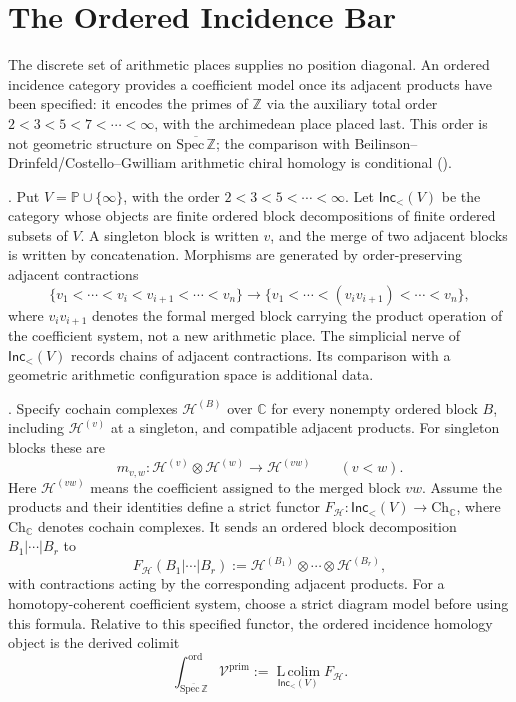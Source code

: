 \section{The Ordered Incidence Bar}
\label{v4-arith:3d-acs:E1-bar}

The discrete set of arithmetic places supplies no position diagonal.
An ordered incidence category provides a coefficient model once its
adjacent products have been specified: it encodes
the primes of \(\mathbb Z\) via the auxiliary total order
\(2<3<5<7<\cdots<\infty\), with the archimedean place placed last.
This order is not geometric structure on
\(\overline{\mathrm{Spec}\,\mathbb Z}\); the comparison with
Beilinson--Drinfeld/Costello--Gwilliam arithmetic chiral homology is
conditional ().

\begin{definition}
\label{v4-arith:3d-acs:def:ordered-incidence-category}
\ClaimStatusDefinitional. Put \(V=\mathbb P\cup\{\infty\}\), with
the order \(2<3<5<\cdots<\infty\). Let
\(\mathsf{Inc}_{<}(V)\) be the category whose objects are finite
ordered block decompositions of finite ordered subsets of \(V\).
A singleton block is written \(v\), and the merge of two adjacent
blocks is written by concatenation. Morphisms are generated by
order-preserving adjacent contractions
\[
\{v_{1}<\cdots<v_{i}<v_{i+1}<\cdots<v_{n}\}
\longrightarrow
\{v_{1}<\cdots<(v_{i}v_{i+1})<\cdots<v_{n}\},
\]
where \(v_{i}v_{i+1}\) denotes the formal merged block carrying the
product operation of the coefficient system, not a new arithmetic
place. The simplicial nerve of \(\mathsf{Inc}_{<}(V)\) records
chains of adjacent contractions. Its comparison with a geometric
arithmetic configuration space is additional data.
\end{definition}

\begin{definition}
\label{v4-arith:3d-acs:def:ordered-chiral-homology}
\ClaimStatusDefinitional. Specify cochain complexes
\(\mathcal H^{(B)}\) over \(\mathbb C\) for every nonempty
ordered block \(B\), including \(\mathcal H^{(v)}\) at a singleton,
and compatible adjacent products. For singleton blocks these are
\[
m_{v,w}\colon \mathcal H^{(v)}\otimes \mathcal H^{(w)}
\longrightarrow \mathcal H^{(vw)}
\qquad (v<w).
\]
Here \(\mathcal H^{(vw)}\) means the coefficient assigned to the
merged block \(vw\).
Assume the products and their identities define a strict functor
\(F_{\mathcal H}\colon\mathsf{Inc}_{<}(V)\to\mathrm{Ch}_{\mathbb C}\),
where \(\mathrm{Ch}_{\mathbb C}\) denotes cochain complexes. It
sends an ordered block decomposition \(B_{1}|\cdots|B_{r}\) to
\[
F_{\mathcal H}(B_{1}|\cdots|B_{r})
:=\mathcal H^{(B_{1})}\otimes\cdots\otimes\mathcal H^{(B_{r})},
\]
with contractions acting by the corresponding adjacent products.
For a homotopy-coherent coefficient system, choose a strict
diagram model before using this formula. Relative to this specified
functor, the ordered incidence homology object is the derived colimit
\[
\int_{\overline{\mathrm{Spec}\,\mathbb Z}}^{\mathrm{ord}}
\mathcal V^{\mathrm{prim}}
:=
\operatorname*{L\,colim}_{\mathsf{Inc}_{<}(V)}F_{\mathcal H}.
\]
\end{definition}

